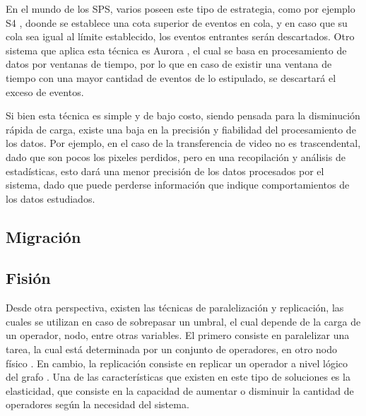 En el mundo de los SPS, varios poseen este tipo de estrategia, como por ejemplo S4 \citep{s4}, doonde se establece una cota superior de eventos en cola, y en caso que su cola sea igual al límite establecido, los eventos entrantes serán descartados. Otro sistema que aplica esta técnica es Aurora \citep{aurora}, el cual se basa en procesamiento de datos por ventanas de tiempo, por lo que en caso de existir una ventana de tiempo con una mayor cantidad de eventos de lo estipulado, se descartará el exceso de eventos.

Si bien esta técnica es simple y de bajo costo, siendo pensada para la disminución rápida de carga, existe una baja en la precisión y fiabilidad del procesamiento de los datos. Por ejemplo, en el caso de la transferencia de video no es trascendental, dado que son pocos los pixeles perdidos, pero en una recopilación y análisis de estadísticas, esto dará una menor precisión de los datos procesados por el sistema, dado que puede perderse información que indique comportamientos de los datos estudiados.

\subsection{Migración}

\subsection{Fisión}
Desde otra perspectiva, existen las técnicas de paralelización y replicación, las cuales se utilizan en caso de sobrepasar un umbral, el cual depende de la carga de un operador, nodo, entre otras variables. El primero consiste en paralelizar una tarea, la cual está determinada por un conjunto de operadores, en otro nodo físico \citep{IshiiS11}. En cambio, la replicación consiste en replicar un operador a nivel lógico del grafo \citep{MadsenTZ14}. Una de las características que existen en este tipo de soluciones es la elasticidad, que consiste en la capacidad de aumentar o disminuir la cantidad de operadores según la necesidad del sistema.

